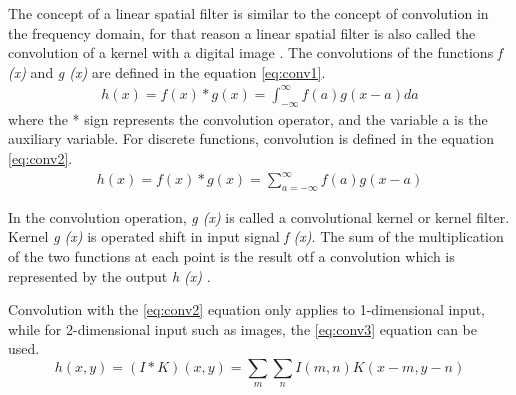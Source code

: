 The concept of a linear spatial filter is similar to the concept of convolution in the frequency domain, for that reason a linear spatial filter is also called the convolution of a kernel with a digital image \cite{book:gonzalez}. The convolutions of the functions \textit{f (x)} and \textit{g (x)} are defined in the equation \ref{eq:conv1}.
\begin{equation}
    \label{eq:conv1}
    \begin{split}
h(x) = f(x) * g(x) = \int_{-\infty}^{\infty} f(a) g(x-a) da
    \end{split}
\end{equation}
where the * sign represents the convolution operator, and the variable a is the auxiliary variable. For discrete functions, convolution is defined in the equation \ref{eq:conv2}.
\begin{equation}
    \label{eq:conv2}
    \begin{split}
h(x) = f(x) * g(x) = \sum_{a=-\infty}^{\infty} f(a)g(x-a)
    \end{split}
\end{equation}


In the convolution operation, \textit{g (x)} is called a convolutional kernel or kernel filter. Kernel \textit{g (x)} is operated shift in input signal \textit{f (x)}. The sum of the multiplication of the two functions at each point is the result otf a convolution which is represented by the output \textit{h (x)} \cite{book:munir}.


Convolution with the \ref{eq:conv2} equation only applies to 1-dimensional input, while for 2-dimensional input such as images, the \ref{eq:conv3} equation can be used.
\begin{equation}
    \label{eq:conv3}
h(x,y) = (I*K)(x,y) = \sum_{m} \sum_{n} I(m,n)K(x-m, y-n)
\end{equation}

